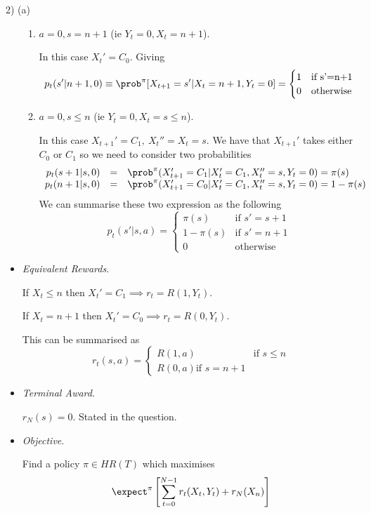 \documentclass[11pt,a4paper]{article}
\begin{document}
\begin{answer}{2) (a)}
\begin{itemize}
\begin{enumerate}
      \item $a=0,s=n+1$ (ie $Y_t=0,X_t=n+1$).
      \par In this case $X_t'=C_0$. Giving
      \[ p_t(s'|n+1,0)\equiv\prob^\pi[X_{t+1}=s'|X_t=n+1,Y_t=0]=\begin{cases}1&\text{if s'=n+1}\\0&\text{otherwise}\end{cases} \]

      \item $a=0,s\leq n$ (ie $Y_t=0,X_t=s\leq n$).
      \par In this case $X_{t+1}'=C_1,\ X_t''=X_t=s$. We have that $X_{t+1}'$ takes either $C_0$ or $C_1$ so we need to consider two probabilities
      \[\begin{array}{rcl}
        p_t(s+1|s,0)&=&\prob^\pi(X_{t+1}'=C_1|X_t'=C_1,X_t''=s,Y_t=0)=\pi(s)\\
        p_t(n+1|s,0)&=&\prob^\pi(X_{t+1}'=C_0|X_t'=C_1,X_t''=s,Y_t=0)=1-\pi(s)\\
      \end{array}\]
      We can summarise these two expression as the following
      \[ p_t(s'|s,a)=\begin{cases}
        \pi(s)&\text{if }s'=s+1\\
        1-\pi(s)&\text{if }s'=n+1\\
        0&\text{otherwise}
      \end{cases} \]
    \end{enumerate}

    \item \textit{Equivalent Rewards}.
    \par If $X_t\leq n$ then $X_t'=C_1\implies r_t=R(1,Y_t)$.
    \par If $X_t=n+1$ then $X_t'=C_0\implies r_t=R(0,Y_t)$.
    \par This can be summarised as
    \[ r_t(s,a)=\begin{cases}R(1,a)&\text{if }s\leq n\\R(0,a)\text{if }s=n+1\end{cases} \]

    \item \textit{Terminal Award}.
    \par $r_N(s)=0$. Stated in the question.

    \item \textit{Objective}.
    \par Find a policy $\pi\in HR(T)$ which maximises
    \[ \expect^\pi\left[\sum_{t=0}^{N-1}r_t(X_t,Y_t)+r_N(X_n)\right] \]

  \end{itemize}
\end{answer}
\end{document}
